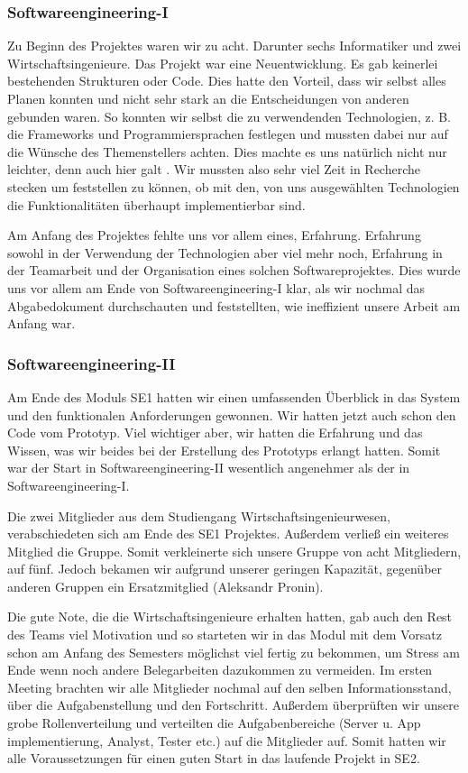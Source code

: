 \documentclass[10pt]{article}
\begin{document}
\subsubsection{Softwareengineering-I}
Zu Beginn des Projektes waren wir zu acht. Darunter sechs Informatiker und zwei Wirtschaftsingenieure.
Das Projekt war eine Neuentwicklung. Es gab keinerlei bestehenden Strukturen oder Code. Dies hatte den Vorteil, dass wir
selbst alles Planen konnten und nicht sehr stark an die Entscheidungen von anderen gebunden waren. So konnten wir
selbst die zu verwendenden Technologien, z. B. die Frameworks und Programmiersprachen festlegen und mussten dabei
nur auf die Wünsche des Themenstellers achten. Dies machte es uns natürlich nicht nur leichter, denn auch
hier galt . Wir mussten also sehr viel Zeit in Recherche stecken um
feststellen zu können, ob mit den, von uns ausgewählten Technologien die Funktionalitäten überhaupt implementierbar sind.\par
\medskip
Am Anfang des Projektes fehlte uns vor allem eines, Erfahrung. Erfahrung sowohl in der Verwendung der Technologien
aber viel mehr noch, Erfahrung in der Teamarbeit und der Organisation eines solchen Softwareprojektes.
Dies wurde uns vor allem am Ende von Softwareengineering-I klar, als wir nochmal das Abgabedokument durchschauten
und feststellten, wie ineffizient unsere Arbeit am Anfang war.

\subsubsection{Softwareengineering-II}
Am Ende des Moduls SE1 hatten wir einen umfassenden
Überblick in das System und den funktionalen Anforderungen gewonnen. 
Wir hatten jetzt auch schon den Code vom Prototyp. Viel wichtiger aber, wir hatten die Erfahrung und das Wissen, was
wir beides bei der Erstellung des Prototyps erlangt hatten. Somit war der Start in Softwareengineering-II wesentlich
angenehmer als der in Softwareengineering-I.\par
\medskip
Die zwei Mitglieder aus dem Studiengang Wirtschaftsingenieurwesen, verabschiedeten 
sich am Ende des SE1 Projektes.
Außerdem verließ ein weiteres Mitglied die Gruppe. Somit verkleinerte sich unsere Gruppe von acht Mitgliedern,
auf fünf. Jedoch bekamen wir aufgrund unserer geringen Kapazität, 
gegenüber anderen Gruppen ein Ersatzmitglied (Aleksandr Pronin). \par 
\medskip
 Die gute Note, die die Wirtschaftsingenieure erhalten hatten, gab auch den
Rest des Teams viel Motivation und so starteten wir in das Modul mit dem Vorsatz schon am Anfang des Semesters möglichst
viel fertig zu bekommen, um Stress am Ende wenn noch andere Belegarbeiten dazukommen zu vermeiden.
Im ersten Meeting brachten wir alle Mitglieder nochmal auf den selben Informationsstand, 
über die Aufgabenstellung und den Fortschritt. 
Außerdem überprüften wir unsere grobe Rollenverteilung und verteilten die Aufgabenbereiche 
(Server u. App implementierung, Analyst, Tester etc.)
auf die Mitglieder auf. Somit hatten wir alle Voraussetzungen für einen guten Start in das laufende Projekt in SE2.
\end{document}
